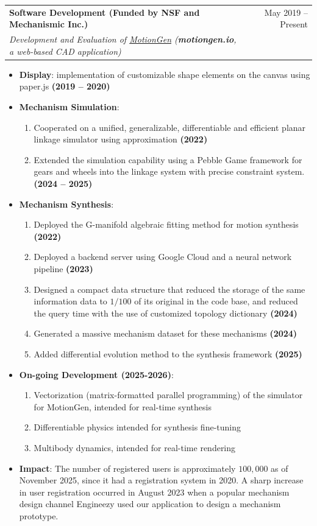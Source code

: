 \documentclass[letterpaper,10pt]{article}
\makeatletter
\newcommand{\resumeItem}[1]{
  \item\small{
    {#1 \vspace{-2pt}}
  }
}
\newcommand{\resumeSubheading}[4]{
  \vspace{-2pt}\item
    \begin{tabular*}{0.97\textwidth}[t]{l@{\extracolsep{\fill}}r}
      \textbf{#1} & #2 \\
      \textit{\small#3} & \textit{\small #4} \\
    \end{tabular*}\vspace{-7pt}
}
\newcommand{\resumeItemListStart}{\begin{itemize}}
\newcommand{\resumeItemListEnd}{\end{itemize}\vspace{-5pt}}
\makeatother
\begin{document}
    \resumeSubheading
    {Software Development (Funded by NSF and Mechanismic Inc.)}{May 2019 -- Present}
    {Development and Evaluation of \href{motiongen.io}{MotionGen} (\textbf{motiongen.io}, a web-based CAD application)}{}
    \resumeItemListStart
        \resumeItem{\textbf{Display}: implementation of customizable shape elements on the canvas using paper.js \textbf{(2019 -- 2020)}}
        \resumeItem{\textbf{Mechanism Simulation}: \begin{enumerate}
            \item Cooperated on a unified, generalizable, differentiable and efficient planar linkage simulator using approximation \textbf{(2022)}
            \item Extended the simulation capability using a Pebble Game framework for gears and wheels into the linkage system with precise constraint system. \textbf{(2024 -- 2025)}
        \end{enumerate}} 
        \resumeItem{\textbf{Mechanism Synthesis}:  \begin{enumerate}
            \item Deployed the G-manifold algebraic fitting method for motion synthesis \textbf{(2022)}
            \item Deployed a backend server using Google Cloud and a neural network pipeline \textbf{(2023)}
            \item Designed a compact data structure that reduced the storage of the same information data to $1/100$ of its original in the code base, and reduced the query time with the use of customized topology dictionary \textbf{(2024)}
            \item Generated a massive mechanism dataset for these mechanisms \textbf{(2024)}
            \item Added differential evolution method to the synthesis framework \textbf{(2025)} 
        \end{enumerate}} 
        \resumeItem{\textbf{On-going Development (2025-2026)}: 
        \begin{enumerate}
            \item Vectorization (matrix-formatted parallel programming) of the simulator for MotionGen, intended for real-time synthesis
            \item Differentiable physics intended for synthesis fine-tuning 
            \item Multibody dynamics, intended for real-time rendering 
        \end{enumerate} }
        \resumeItem{\textbf{Impact}: The number of registered users is approximately $100,000$ as of November 2025, since it had a registration system in 2020. A sharp increase in user registration occurred in August 2023 when a popular mechanism design channel Engineezy used our application to design a mechanism prototype. } 
        \resumeItemListEnd
\end{document}
